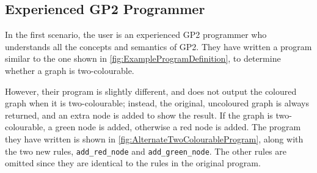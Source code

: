 \documentclass[authoryearcitations]{UoYCSproject}
\begin{document}

\subsection{Experienced GP2 Programmer}

In the first scenario, the user is an experienced GP2 programmer who understands
all the concepts and semantics of GP2. They have written a program similar to
the one shown in \autoref{fig:ExampleProgramDefinition}, to determine whether a
graph is two-colourable.

However, their program is slightly different, and does not output the coloured
graph when it is two-colourable; instead, the original, uncoloured graph is
always returned, and an extra node is added to show the result. If the graph is
two-colourable, a green node is added, otherwise a red node is added. The
program they have written is shown in \autoref{fig:AlternateTwoColourableProgram},
along with the two new rules, \texttt{add\_red\_node} and \texttt{add\_green\_node}.
The other rules are omitted since they are identical to the rules in the
original program.
\end{document}
